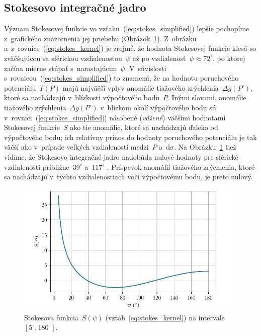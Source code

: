 \documentclass[a4paper, 12pt]{book}
\newcommand{\diff}{\mathrm d}
\begin{document}
\subsection{Stokesovo integračné jadro}
\label{sec:stokes_kernel}

Význam Stokesovej funkcie vo vzťahu~(\ref{eq:stokes_simplified}) lepšie 
pochopíme z~grafického znázornenia jej priebehu 
(Obrázok~\ref{fig:stokes_kernel}).  Z~obrázku 
a~z~rovnice~(\ref{eq:stokes_kernel}) je zrejmé, že hodnota Stokesovej funkcie 
klesá so zväčšujúcou sa sférickou vzdialenosťou~$\psi$ až po vzdialenosť~$\psi 
\approx 72^\circ$, po ktorej začína mierne stúpať s~narastajúcim~$\psi$.  
V~súvislosti s~rovnicou~(\ref{eq:stokes_simplified}) to znamená, že na hodnotu 
poruchového potenciálu~$T(P)$ majú najväčší vplyv anomálie tiažového 
zrýchlenia~$\Delta g(P')$, ktoré sa nachádzajú v~blízkosti výpočtového 
bodu~$P$.  Inými slovami, anomálie tiažového zrýchlenia~$\Delta g(P')$ 
v~blízkom okolí výpočtového bodu sú v~rovnici~(\ref{eq:stokes_simplified}) 
násobené (\emph{vážené}) väčšími hodnotami Stokesovej funkcie~$S$ ako tie 
anomálie, ktoré sa nachádzajú ďaleko od výpočtového bodu; ich relatívny prínos 
do hodnoty poruchového potenciálu je tak väčší ako v~prípade veľkých 
vzdialeností medzi~$P$ a~$\diff\sigma$.  Na Obrázku~\ref{fig:stokes_kernel} 
tiež vidíme, že Stokesovo integračné jadro nadobúda nulové hodnoty pre sférické 
vzdialenosti približne~$39^\circ$ a~$117^\circ$ \parencite{TorgeGeodesy}.  
Príspevok anomálií tiažového zrýchlenia, ktoré sa nachádzajú v~týchto 
vzdialenostiach voči výpočtovému bodu, je preto nulový.

\begin{figure}[bt]
\centering
\includegraphics{./fig-stokes-kernel.pdf}
\caption{Stokesova funkcia~$S(\psi)$ (vzťah~\ref{eq:stokes_kernel}) na 
intervale~$[5^\circ, 180^\circ]$.}
\label{fig:stokes_kernel}
\end{figure}
\end{document}
